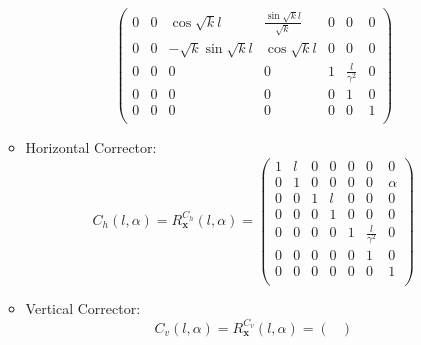\begin{itemize}
\begin{itemize}
\begin{equation*}
\begin{pmatrix}
                                                  0 & 0 & \cos{\sqrt{k} l} & \frac{\sin{\sqrt{k} l}}{\sqrt{k}} & 0 & 0 & 0 \\ %
                                                  0 & 0 & -\sqrt{k}\sin{\sqrt{k} l} & \cos{\sqrt{k} l} & 0 & 0 & 0  \\ %
                                                  0 & 0 & 0 & 0 & 1 & \frac{l}{\gamma^2} & 0 \\ %
                                                  0 & 0 & 0 & 0 & 0 & 1 & 0 \\ %
                                                  0 & 0 & 0 & 0 & 0 & 0 & 1 \\
                                              \end{pmatrix}
            \end{equation*}
        \item Horizontal Corrector: 
            \begin{equation*}
                C_h(l,\alpha) = R_{\bm{x}}^{C_h}(l,\alpha) = \begin{pmatrix}
                                                                 1 & l & 0 & 0 & 0 & 0 & 0 \\ %
                                                                 0 & 1 & 0 & 0 & 0 & 0 & \alpha \\ %
                                                                 0 & 0 & 1 & l & 0 & 0 & 0 \\ %
                                                                 0 & 0 & 0 & 1 & 0 & 0 & 0 \\ %
                                                                 0 & 0 & 0 & 0 & 1 & \frac{l}{\gamma^2} & 0 \\ %
                                                                 0 & 0 & 0 & 0 & 0 & 1 & 0 \\ %
                                                                 0 & 0 & 0 & 0 & 0 & 0 & 1 \\
                                                             \end{pmatrix}
            \end{equation*}
        \item Vertical Corrector:
            \begin{equation*}
                C_v(l,\alpha) = R_{\bm{x}}^{C_v}(l,\alpha) = \begin{pmatrix}

\end{pmatrix}
\end{equation*}
\end{itemize}
\end{itemize}
